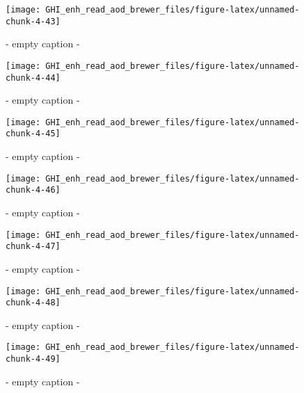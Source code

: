 \documentclass[
  10pt,
  a4paper,oneside]{article}
\begin{document}
\begin{figure}[H]

{\centering \texttt{[image: GHI\_enh\_read\_aod\_brewer\_files/figure-latex/unnamed-chunk-4-43]} 

}

\caption{ - empty caption - }\label{fig:unnamed-chunk-4-43}
\end{figure}
\begin{figure}[H]

{\centering \texttt{[image: GHI\_enh\_read\_aod\_brewer\_files/figure-latex/unnamed-chunk-4-44]} 

}

\caption{ - empty caption - }\label{fig:unnamed-chunk-4-44}
\end{figure}
\begin{figure}[H]

{\centering \texttt{[image: GHI\_enh\_read\_aod\_brewer\_files/figure-latex/unnamed-chunk-4-45]} 

}

\caption{ - empty caption - }\label{fig:unnamed-chunk-4-45}
\end{figure}
\begin{figure}[H]

{\centering \texttt{[image: GHI\_enh\_read\_aod\_brewer\_files/figure-latex/unnamed-chunk-4-46]} 

}

\caption{ - empty caption - }\label{fig:unnamed-chunk-4-46}
\end{figure}
\begin{figure}[H]

{\centering \texttt{[image: GHI\_enh\_read\_aod\_brewer\_files/figure-latex/unnamed-chunk-4-47]} 

}

\caption{ - empty caption - }\label{fig:unnamed-chunk-4-47}
\end{figure}
\begin{figure}[H]

{\centering \texttt{[image: GHI\_enh\_read\_aod\_brewer\_files/figure-latex/unnamed-chunk-4-48]} 

}

\caption{ - empty caption - }\label{fig:unnamed-chunk-4-48}
\end{figure}
\begin{figure}[H]

{\centering \texttt{[image: GHI\_enh\_read\_aod\_brewer\_files/figure-latex/unnamed-chunk-4-49]} 

}

\caption{ - empty caption - }\label{fig:unnamed-chunk-4-49}
\end{figure}
\end{document}
